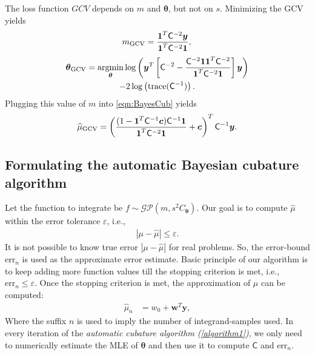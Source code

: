 \documentclass[twocolumn]{svjour3}          %
\newcommand{\bm}[1]{\boldsymbol{#1}}
\newcommand{\trace}[1]{\textup{trace}{#1}}
\newcommand{\vtheta}{{\bm{\theta}}}
\newcommand{\vc}{\bm{c}}
\newcommand{\vw}{\bm{w}}
\newcommand{\vy}{\bm{y}}
\newcommand{\vone}{\bm{1}}
\newcommand{\mC}{\mathsf{C}}
\newcommand{\hmu}{\widehat{\mu}}
\newcommand{\errtol}{\varepsilon}
\newcommand{\errn}{\text{err}_{n}}
\newenvironment{nalign}{
    \begin{equation}
    \begin{aligned}
}{
    \end{aligned}
    \end{equation}
    \ignorespacesafterend
}
\providecommand{\argmin}{\operatorname*{argmin}}
\begin{document}
The loss function $GCV$ depends on $m$ and $\vtheta$, but not on $s$.  Minimizing the GCV  yields
\begin{equation}
m_{\textup{GCV}} = \frac{\vone^T \mC^{-2} \vy}{\vone^T \mC^{-2} \vone},\\ 
\end{equation}
\begin{multline}
\vtheta_{\textup{GCV}} = \argmin_\vtheta \log \left (  \vy^T \left[\mC^{-2} - \frac{\mC^{-2} \vone \vone^T \mC^{-2}}{\vone^T \mC^{-2} \vone}  \right] \vy \right ) \\
- 2 \log \left ( \trace(\mC^{-1}) \right ).
\end{multline}
Plugging this value of $m$ into \eqref{eqn:BayesCub} yields
\begin{equation}
\label{eqn:muCV}
\widehat{\mu}_{\textup{GCV}}
= \left(\frac{(1 - \vone^T  \mC^{-1}\vc) \mC^{-1} \vone}{\vone^T \mC^{-2} \vone} + \vc \right)^T \mC^{-1} \vy.
\end{equation}

















\subsection{Formulating the automatic Bayesian cubature algorithm}
\label{sec:bayes_cubature_algo}
Let the function to integrate be $f \sim \mathcal{GP}(m,s^2 C_\vtheta)$.
Our goal is to compute $\hat{\mu}$ within the error tolerance $\errtol$, i.e.,
\begin{align*}
|\mu - \hat{\mu}| \leq \errtol.
\end{align*}
It is not possible to know true error $|\mu - \hat{\mu}|$ for real problems. So, the error-bound $\errn$ is used as the approximate error estimate.
Basic principle of our algorithm is to keep adding more function values till the stopping criterion is met, i.e., $\errn \le \errtol$. 
Once the stopping criterion is met, the approximation of $\mu$ can be computed:
\begin{nalign}
\label{eqn_muhat}
\hmu_n &= w_0 + \vw^T \vy,
\end{nalign}
Where the suffix $n$ is used to imply the number of integrand-samples used. In every iteration of the \emph{automatic cubature algorithm (\ref{algorithm1})}, we only need to numerically estimate the MLE of $\vtheta$ and then use it to compute $\mC$ and $\errn$. 
\end{document}
